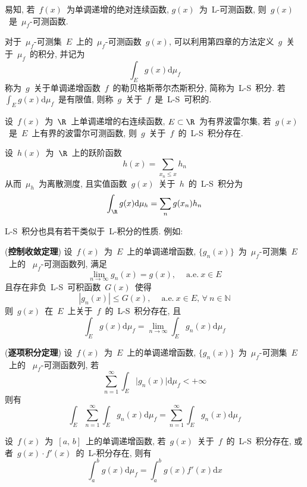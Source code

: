 易知, 若~$f(x)$~为单调递增的绝对连续函数, $g(x)$~为~L-可测函数, 则~$g(x)$~是~$\mu_f$-可测函数.

\begin{Definition}
对于~$\mu_f$-可测集~$E$~上的~$\mu_f$-可测函数~$g(x)$, 可以利用第四章的方法定义~$g$~关于~$\mu_f$~的积分, 并记为
\[
\int_E g(x) \mathrm{d} \mu_f
\]
称为~$g$~关于单调递增函数~$f$~的勒贝格\raisebox{0.5mm}{--}斯蒂尔杰斯积分, 简称为~L-S~积分. 若~$\int_E g(x) \mathrm{d} \mu_f$~是有限值, 则称~$g$~关于~$f$~是~L-S~可积的.
\end{Definition}

\begin{Example}
设~$f(x)$~为~$\R$~上单调递增的右连续函数, $E \subset \R$~为有界波雷尔集, 若~$g(x)$~是~$E$~上有界的波雷尔可测函数, 则~$g$~关于~$f$~的~L-S~积分存在.
\end{Example}

\begin{Example}
设~$h(x)$~为~$\R$~上的跃阶函数
\[
h(x) = \sum_{x_n \leqslant x} h_n
\]
从而~$\mu_h$~为离散测度, 且实值函数~$g(x)$~关于~$h$~的~L-S~积分为
\[
\int_\R g(x) \mathrm{d} \mu_h = \sum_n g(x_n) h_n
\]
\end{Example}

L-S~积分也具有若干类似于~L-积分的性质. 例如:

\begin{Theorem}
(\textbf{控制收敛定理}) 设~$f(x)$~为~$E$~上的单调递增函数, $\{g_n(x)\}$~为~$\mu_f$-可测集~$E$~上的
~$\mu_f$-可测函数列, 满足
\[
\lim_{n \to \infty} g_n(x) = g(x), \quad \mathrm{~a.e.~} x \in E
\]
且存在非负~L-S~可积函数~$G(x)$~使得
\[
|g_n(x)| \leqslant G(x), \quad \mathrm{~a.e.~} x \in E, \, \forall~n \in \mathbb{N}
\]
则~$g(x)$~在~$E$~上关于~$f$~的~L-S~积分存在, 且
\[
\int_E g(x) \mathrm{d} \mu_f = \lim_{n \to \infty} \int_E g_n(x) \mathrm{d} \mu_f
\]
\end{Theorem}

\begin{Theorem}
(\textbf{逐项积分定理}) 设~$f(x)$~为~$E$~上的单调递增函数, $\{g_n(x)\}$~为~$\mu_f$-可测集~$E$~上的
~$\mu_f$-可测函数列, 若
\[
\sum_{n=1}^\infty \int_E \big| g_n(x) \big| \mathrm{d} \mu_f < + \infty
\]
则有
\[
\int_E \sum_{n=1}^\infty \int_E g_n(x) \mathrm{d} \mu_f = \sum_{n=1}^\infty \int_E g_n(x) \mathrm{d} \mu_f
\]
\end{Theorem}

\begin{Example}
设~$f(x)$~为~$[a,\,b]$~上的单调递增函数, 若~$g(x)$~关于~$f$~的~L-S~积分存在, 或者~$g(x)\cdot f'(x)$~的~L-积分存在, 则有
\[
\int_a^b g(x) \mathrm{d} \mu_f = \int_a^b g(x) f'(x) \mathrm{d} x
\]
\end{Example}

